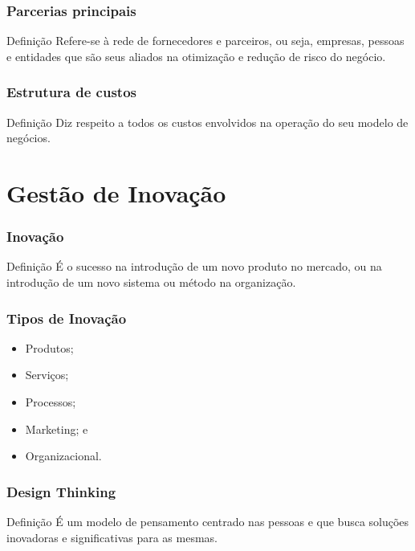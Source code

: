 \documentclass[aspectratio=169]{beamer}
\begin{document}
\begin{frame}
	\frametitle{Parcerias principais}

	\begin{block}{Defini\c cão}
		 Refere-se à rede de fornecedores e parceiros, ou seja, empresas, pessoas e entidades que são seus aliados na otimização e redução de risco do negócio.
	\end{block}
\end{frame}

\begin{frame}
	\frametitle{Estrutura de custos}

	\begin{block}{Defini\c cão}
		 Diz respeito a todos os custos envolvidos na operação do seu modelo de negócios.
	\end{block}
\end{frame}

\section{Gestão de Inova\c cão}

\begin{frame}
	\frametitle{Inova\c cão}

	\begin{block}{Defini\c cão}
		 É o sucesso na introdu\c cão de um novo produto no mercado, ou na introdu\c cão de um novo sistema ou método na organiza\c cão.
	\end{block}
\end{frame}

\begin{frame}
	\frametitle{Tipos de Inova\c cão}

	\begin{itemize}
		 \item Produtos;
		 \item Servi\c cos;
		 \item Processos;
		 \item Marketing; e
		 \item Organizacional.
	\end{itemize}
\end{frame}

\begin{frame}
	\frametitle{Design Thinking}

	\begin{block}{Defini\c cão}
		É um modelo de pensamento centrado nas pessoas e que busca soluções inovadoras e significativas para as mesmas.
	\end{block}
\end{frame}
\end{document}
